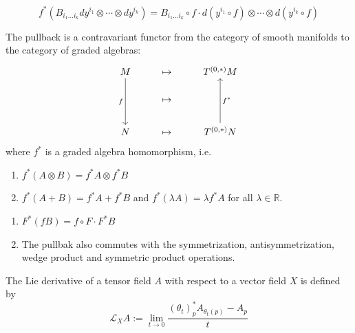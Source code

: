 \documentclass[12pt, oneside]{book}
\begin{document}
\begin{proposition}
    \begin{equation*}
        f^*(B_{i_1\ldots i_k} dy^{i_1} \otimes \cdots \otimes dy^{i_k})
        =
        B_{i_1\ldots i_k}\circ f \cdot d(y^{i_1} \circ f) \otimes \cdots \otimes d(y^{i_k} \circ f)
    \end{equation*}
\end{proposition}

\begin{proposition}
    The pullback is a contravariant functor from the category of smooth manifolds to the category of graded algebras:
    \begin{equation*}
        \begin{tikzcd}
            M \arrow[dd,"f"']& \mapsto &  T^{(0,*)}M\\
            &\mapsto& \\
            N & \mapsto & T^{(0,*)}N \arrow[uu,"f^*"']
        \end{tikzcd}
    \end{equation*}
    where $f^*$ is a graded algebra homomorphism, i.e.
    \begin{enumerate}
        \item
              $f^*(A\otimes B)=f^*A\otimes f^*B$
        \item $f^*(A+B )=f^*A + f^*B$ and $f^*(\lambda A)=\lambda f^*A$ for all $\lambda \in \mathbb{R}$.
    \end{enumerate}
\end{proposition}

\begin{corollary}
    \begin{enumerate}
        \item $F^*(fB)=f\circ F \cdot F^*B$
        \item The pullbak also commutes with the symmetrization, antisymmetrization, wedge product and symmetric product operations.
    \end{enumerate}
\end{corollary}


\begin{definition}
    The Lie derivative of a tensor field $A$ with respect to a vector field $X$ is defined by
    \begin{equation*}
        \mathcal{L}_X A
        :=
        \lim_{t \rightarrow 0} \frac{\left(\theta_{t}\right)^*_p A_{\theta_t(p)}-A_p}{t}
    \end{equation*}
\end{definition}
\end{document}
